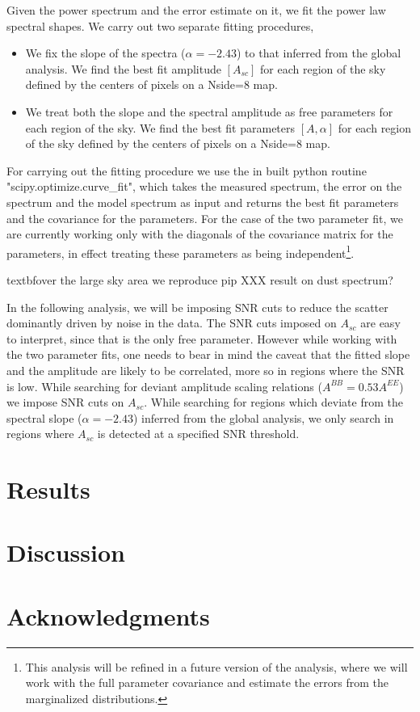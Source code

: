 \documentclass[a4paper,11pt]{article}
\begin{document}
Given the power spectrum and the error estimate on it, we fit the power law spectral shapes. We carry out two separate fitting procedures,
\begin{itemize}
\item We fix the slope of the spectra ($\alpha=-2.43$) to that inferred from the global analysis. We find the best fit amplitude $[A_{sc}]$ for each region of the sky defined by the centers of pixels on a Nside=8 map.
\item We treat both the slope and the spectral amplitude as free parameters for each region of the sky. We find the best fit parameters $[A,\alpha]$ for each region of the sky defined by the centers of pixels on a Nside=8 map.
\end{itemize}
For carrying out the fitting procedure we use the in built python routine "scipy.optimize.curve\_fit", which takes the measured spectrum, the error on the spectrum and the model spectrum as input and returns the best fit parameters and the covariance for the parameters. For the case of the two parameter fit, we are currently working only with the diagonals of the covariance matrix for the parameters, in effect treating these parameters as being independent\footnote{This analysis will be refined in a future version of the analysis, where we will work with the full parameter covariance and estimate the errors from the marginalized distributions.}.

textbf{over the large sky area we reproduce pip XXX result on dust spectrum?}

In the following analysis, we will be imposing SNR cuts to reduce the scatter dominantly driven by noise in the data. The SNR cuts imposed on $A_{sc}$ are easy to interpret, since that is the only free parameter. However while working with the two parameter fits, one needs to bear in mind the caveat that the fitted slope and the amplitude are likely to be correlated, more so in regions where the SNR is low. While searching for deviant amplitude scaling relations ($A^{BB} = 0.53 A^{EE}$)  we impose SNR cuts on $A_{sc}$. While searching for regions which deviate from the spectral slope ($\alpha=-2.43$) inferred from the global analysis, we only search in regions where $A_{sc}$ is detected at a specified SNR threshold.



\section{Results}


\section{Discussion}


\section{Acknowledgments}
\end{document}
